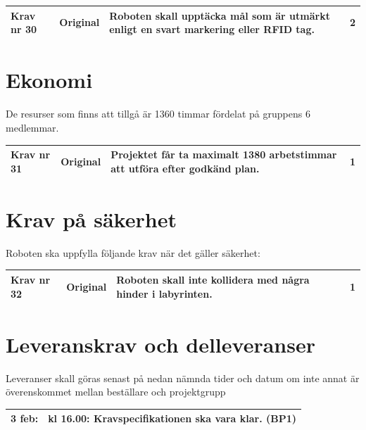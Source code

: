 \documentclass[11pt]{article}
\begin{document}
\begin{flushleft}
\begin{center}
\begin{longtable}{|l|l|p{.70\linewidth}|l|}
Krav nr 30 &
Original &
Roboten skall upptäcka mål som är utmärkt enligt en svart markering eller RFID tag.&
2 \\ \hline

\end{longtable}
\end{center}

\section{Ekonomi}
De resurser som finns att tillgå är 1360 timmar fördelat på gruppens 6 medlemmar. 

\begin{center}
\begin{longtable}{|l|l|p{.70\linewidth}|l|} \hline

Krav nr 31 &
Original &
Projektet får ta maximalt 1380 arbetstimmar att utföra efter godkänd plan. &
1 \\ \hline
\end{longtable}
\end{center}

\section{Krav på säkerhet}
Roboten ska uppfylla följande krav när det gäller säkerhet:

\begin{center}
\begin{longtable}{|l|l|p{.70\linewidth}|l|} \hline

Krav nr 32 &
Original &
Roboten skall inte kollidera med några hinder i labyrinten. &
1 \\ \hline

\end{longtable}
\end{center}

\pagebreak
\section{Leveranskrav och delleveranser}
Leveranser skall göras senast på nedan nämnda tider och datum om inte annat är överenskommet mellan beställare och projektgrupp
\begin{center}
\begin{longtable}{|l |p{.8\linewidth}|} \hline

3 feb: & 
kl 16.00: Kravspecifikationen ska vara klar. (BP1) \\ \hline


\end{longtable}
\end{center}
\end{flushleft}
\end{document}
